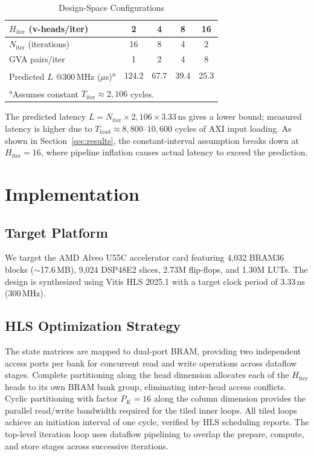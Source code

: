 \documentclass[conference]{IEEEtran}
\begin{document}
\begin{table}[h]
\centering
\caption{Design-Space Configurations}
\label{tab:configs}
\begin{tabular}{lcccc}
\toprule
$H_{\mathrm{iter}}$ (v-heads/iter) & 2 & 4 & 8 & 16 \\
\midrule
$N_{\mathrm{iter}}$ (iterations) & 16 & 8 & 4 & 2 \\
GVA pairs/iter & 1 & 2 & 4 & 8 \\
Predicted $L$ @300\,MHz ($\mu$s)\textsuperscript{a} & 124.2 & 67.7 & 39.4 & 25.3 \\
\bottomrule
\multicolumn{5}{l}{\footnotesize \textsuperscript{a}Assumes constant $T_{\mathrm{iter}} \approx 2{,}106$ cycles.}
\end{tabular}
\end{table}

\noindent The predicted latency
$L = N_{\mathrm{iter}} \times 2{,}106 \times 3.33\,\text{ns}$ gives
a lower bound; measured latency is higher due to
$T_{\mathrm{load}} \approx 8{,}800$--$10{,}600$ cycles of AXI input
loading. As shown in Section~\ref{sec:results}, the constant-interval
assumption breaks down at $H_{\mathrm{iter}}{=}16$, where pipeline
inflation causes actual latency to exceed the prediction.

\section{Implementation}

\subsection{Target Platform}

We target the AMD Alveo U55C accelerator card featuring 4,032 BRAM36 blocks
($\sim$17.6\,MB), 9,024 DSP48E2 slices, 2.73M flip-flops, and 1.30M
LUTs. The design is synthesized using Vitis HLS 2025.1 with a target
clock period of 3.33\,ns (300\,MHz).

\subsection{HLS Optimization Strategy}

The state matrices are mapped to dual-port BRAM, providing two independent
access ports per bank for concurrent read and write operations across
dataflow stages. Complete partitioning along the head dimension allocates
each of the $H_{\mathrm{iter}}$ heads to its own BRAM bank group,
eliminating inter-head access conflicts. Cyclic partitioning with factor
$P_K{=}16$ along the column dimension provides the parallel read/write
bandwidth required for the tiled inner loops. All tiled loops achieve an
initiation interval of one cycle, verified by HLS scheduling reports. The
top-level iteration loop uses dataflow pipelining to overlap the prepare,
compute, and store stages across successive iterations.
\end{document}
